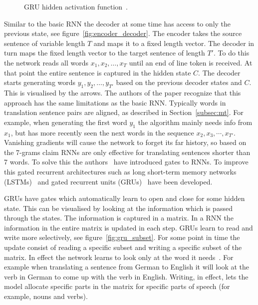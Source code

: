 \begin{figure}
\begin{minipage}{0.48\textwidth}
        \caption{GRU hidden activation function~\cite[Figure 2]{cho2014learning}.}
    \label{fig:gru}
    \end{minipage}
\end{figure}

Similar to the basic RNN the decoder at some time has access to only the previous state, see figure~\ref{fig:encoder_decoder}.
The encoder takes the source sentence of variable length $T$ and maps it to a fixed length vector.
The decoder in turn maps the fixed length vector to the target sentence of length $T'$.
To do this the network reads all words $x_1, x_2, \ldots, x_T$ until an end of line token is received.
At that point the entire sentence is captured in the hidden state $C$.
The decoder starts generating words $y_1, y_2, \ldots, y_{T'}$ based on the previous decoder states and $C$.
This is visualised by the arrows.
The authors of the paper recognize that this approach has the same limitations as the basic RNN.
Typically words in translation sentence pairs are aligned, as described in Section~\ref{subsec:mt}.
For example, when generating the first word $y_1$ the algorithm mainly needs info from $x_1$, but has more recently seen the next words in the sequence $x_2, x_3, \cdots, x_{T'}$.
Vanishing gradients will cause the network to forget its far history, so based on the 7-grams claim RNNs are only effective for translating sentences shorter than 7 words.
To solve this the authors~\citep{cho2014learning} have introduced gates to RNNs.
To improve this gated recurrent architectures such as long short-term memory networks (LSTMs)~\citep{hochreiter1997long} and gated recurrent units (GRUs)~\citep{cho2014learning} have been developed.

GRUs have gates which automatically learn to open and close for some hidden state.
This can be visualised by looking at the information which is passed through the states.
The information is captured in a matrix.
In a RNN the information in the entire matrix is updated in each step.
GRUs learn to read and write more selectively, see figure~\ref{fig:gru_subset}.
For some point in time the update consist of reading a specific subset and writing a specific subset of the matrix.
In effect the network learns to look only at the word it needs~\citep{manning2017lectures}.
For example when translating a sentence from German to English it will look at the verb in German to come up with the verb in English.
Writing, in effect, lets the model allocate specific parts in the matrix for specific parts of speech (for example, nouns and verbs).

